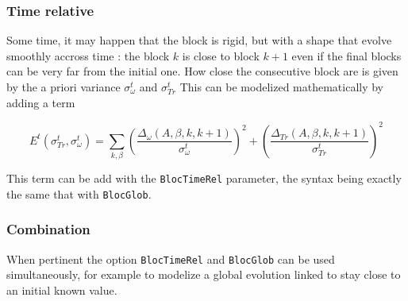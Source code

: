 \subsubsection{Time relative }

Some time, it may happen that the block is rigid, but with a shape that evolve smoothly accross time :
the block $k$ is close to block $k+1$ even if the final blocks can be very far from the initial one.
How close the consecutive block are is given by the a priori variance $\sigma^t_{\omega}$ and $\sigma^t_{Tr}$ 
This can be modelized mathematically by adding a term

\begin{equation}
      E^{t}(\sigma^t_{Tr},\sigma^t_{\omega}) =
      \sum _{k,\beta}
      (\frac{\Delta_{\omega}(A,\beta,k,k+1)}{\sigma^t_{\omega}}) ^2
      +(\frac{\Delta_{Tr}(A,\beta,k,k+1)}{\sigma^t_{Tr}})^2
\end{equation}

This term can be add with the {\tt BlocTimeRel} parameter, the syntax being exactly the same that 
with {\tt BlocGlob}.

\subsubsection{Combination}

When pertinent the option  {\tt BlocTimeRel} and {\tt BlocGlob} can be used 
simultaneously, for example to modelize a global evolution linked to stay close
to an initial known value.






